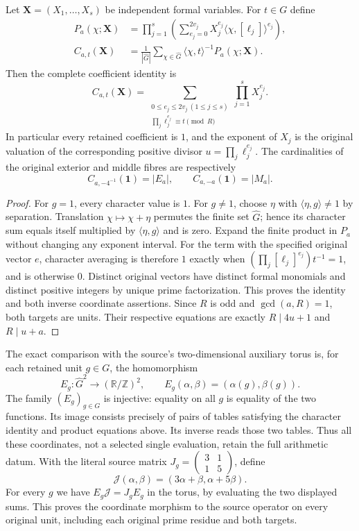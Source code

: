 \begin{lemma}
\label{lem:ns-labelled-character-packet}
Let $\mathbf X=(X_1,\ldots,X_s)$ be independent formal variables. For
$t\in G$ define
\[
 \begin{split}
 P_a(\chi;\mathbf X)
   &=\prod_{j=1}^s\left(\sum_{e_j=0}^{2v_j}
           X_j^{e_j}\langle\chi,[\ell_j]\rangle^{e_j}\right),\\
 C_{a,t}(\mathbf X)
   &=\frac1{|\widehat G|}\sum_{\chi\in\widehat G}
          \langle\chi,t\rangle^{-1}P_a(\chi;\mathbf X).
 \end{split}
\]
Then the complete coefficient identity is
\[
 C_{a,t}(\mathbf X)=
 \sum_{\substack{0\leq e_j\leq2v_j\ (1\leq j\leq s)\\
                   \prod_j\ell_j^{e_j}\equiv t\pmod R}}
       \prod_{j=1}^s X_j^{e_j}.
\]
In particular every retained coefficient is $1$, and the exponent of
$X_j$ is the original valuation of the corresponding positive divisor
$u=\prod_j\ell_j^{e_j}$. The cardinalities of the original exterior
and middle fibres are respectively
\[
 C_{a,-4^{-1}}(\mathbf1)=|E_a|,\qquad
 C_{a,-a}(\mathbf1)=|M_a|.
\]
\end{lemma}
\begin{proof}
For $g=1$, every character value is $1$. For $g\ne1$, choose
$\eta$ with $\langle\eta,g\rangle\ne1$ by separation. Translation
$\chi\mapsto\chi+\eta$ permutes the finite set $\widehat G$; hence
its character sum equals itself multiplied by
$\langle\eta,g\rangle$ and is zero. Expand the finite product in
$P_a$ without changing any exponent interval. For the term with
the specified original vector $e$, character averaging is therefore
$1$ exactly when $(\prod_j[\ell_j]^{e_j})t^{-1}=1$, and is otherwise
$0$. Distinct original vectors have distinct formal monomials and
distinct positive integers by unique prime factorization. This proves
the identity and both inverse coordinate assertions. Since $R$ is
odd and $\gcd(a,R)=1$, both targets are units. Their respective
equations are exactly $R\mid4u+1$ and $R\mid u+a$.
\end{proof}

The exact comparison with the source's two-dimensional auxiliary torus
is, for each retained unit $g\in G$, the homomorphism
\[
 E_g:\widehat G^2\longrightarrow(\mathbb R/\mathbb Z)^2,
 \qquad E_g(\alpha,\beta)=(\alpha(g),\beta(g)).
\]
The family $(E_g)_{g\in G}$ is injective: equality on all $g$ is
equality of the two functions. Its image consists precisely of pairs
of tables satisfying the character identity and product equations
above. Its inverse reads those two tables. Thus all these coordinates,
not a selected single evaluation, retain the full arithmetic datum.
With the literal source matrix $J_g=\left(\begin{smallmatrix}3&1\\1&5\end{smallmatrix}\right)$,
define
\[
 \mathcal J(\alpha,\beta)=(3\alpha+\beta,\alpha+5\beta).
\]
For every $g$ we have $E_g\mathcal J=J_gE_g$ in the torus, by
evaluating the two displayed sums. This proves the coordinate
morphism to the source operator on every original unit, including
each original prime residue and both targets.

